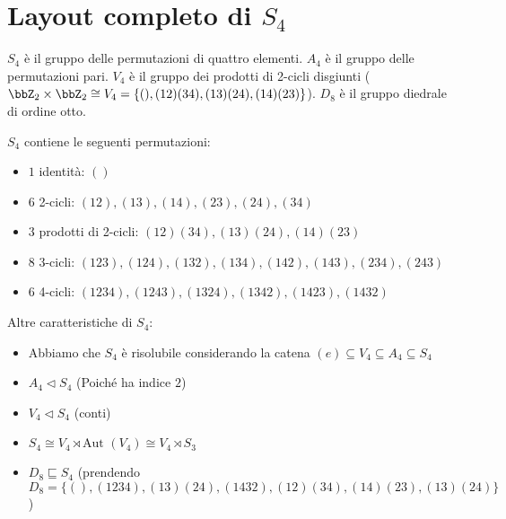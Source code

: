 \documentclass[a4paper,NoNotes,GeneralMath]{stdmdoc}
\newcommand{\sgr}{\sqsubseteq}
\newcommand{\nrm}{\lhd}
\newcommand{\Aut}{\text{Aut }}
\begin{document}
	\section*{Layout completo di $S_4$}
	$S_4$ è il gruppo delle permutazioni di quattro elementi. $A_4$ è il gruppo delle permutazioni pari. $V_4$ è il gruppo dei prodotti di 2-cicli disgiunti ($\bbZ_{2}\times \bbZ_{2} \cong V_4 = \{(), (12)(34), (13)(24), (14)(23)\}$). $D_8$ è il gruppo diedrale di ordine otto.

	$S_4$ contiene le seguenti permutazioni:
	\begin{itemize}
		\item $1$ identità: $()$
		\item $6$ 2-cicli: $(12), (13), (14), (23), (24), (34)$
		\item $3$ prodotti di 2-cicli: $(12)(34), (13)(24), (14)(23)$
		\item $8$ 3-cicli: $(123), (124), (132), (134), (142), (143), (234), (243)$
		\item $6$ 4-cicli: $(1234), (1243), (1324), (1342), (1423), (1432)$
	\end{itemize}

	Altre caratteristiche di $S_4$:
	\begin{itemize}
		\item Abbiamo che $S_4$ è risolubile considerando la catena $(e) \subseteq V_4 \subseteq A_4 \subseteq S_4$
		\item $A_4 \nrm S_4$ (Poiché ha indice $2$)
		\item $V_4 \nrm S_4$ (conti)
		\item $S_4 \cong V_4 \rtimes \Aut(V_4) \cong V_4 \rtimes S_3$
		\item $D_8 \sgr S_4$ (prendendo $D_8 = \{(), (1234), (13)(24), (1432), (12)(34), (14)(23), (13)(24)\}$)
	\end{itemize}
\end{document}
